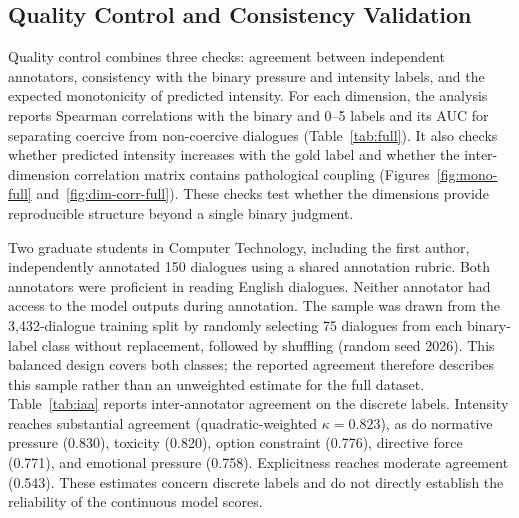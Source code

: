 \documentclass[conference]{IEEEtran}
\begin{document}
\subsection{Quality Control and Consistency Validation}
\label{sec:qc}
Quality control combines three checks: agreement between independent annotators,
consistency with the binary pressure and intensity labels, and the expected
monotonicity of predicted intensity. For each dimension, the analysis reports Spearman
correlations with the binary and 0--5 labels and its AUC for separating
coercive from non-coercive dialogues (Table~\ref{tab:full}). It also checks
whether predicted intensity increases with the gold label and whether the
inter-dimension correlation matrix contains pathological coupling
(Figures~\ref{fig:mono-full} and~\ref{fig:dim-corr-full}). These checks test
whether the dimensions provide reproducible structure beyond a single binary
judgment.

Two graduate students in Computer Technology, including the first author,
independently annotated 150 dialogues using a shared annotation rubric.
Both annotators were proficient in reading English dialogues. Neither
annotator had access to the model outputs during annotation.
The sample was drawn from the 3{,}432-dialogue training split by randomly selecting
75 dialogues from each binary-label class without replacement, followed by
shuffling (random seed 2026). This balanced design covers both classes;
the reported agreement therefore describes this sample rather than an
unweighted estimate for the full dataset.
Table~\ref{tab:iaa}
reports inter-annotator agreement on the discrete labels. Intensity reaches
substantial agreement (quadratic-weighted $\kappa{=}0.823$), as do normative
pressure (0.830), toxicity (0.820), option constraint (0.776), directive
force (0.771), and emotional pressure (0.758). Explicitness reaches moderate
agreement (0.543). These estimates concern discrete labels and do not directly
establish the reliability of the continuous model scores.
\end{document}
